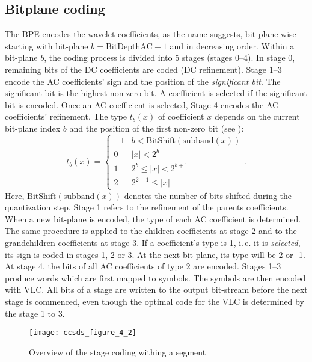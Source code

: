 \subsection{Bitplane coding}
The \gls{BPE} encodes the wavelet coefficients, as the name suggests, bit-plane-wise starting with bit-plane $b=\mathrm{BitDepthAC}-1$ and in decreasing order. Within a bit-plane $b$, the coding process is divided into 5 stages (stages 0--4). In stage 0, remaining bits of the DC coefficients are coded (DC refinement). Stage 1--3 encode the AC coefficients' sign and the position of the \textit{significant bit}. The significant bit is the highest non-zero bit. A coefficient is selected if the significant bit is encoded. Once an AC coefficient is selected, Stage 4 encodes the AC coefficients' refinement. The type $t_b(x)$ of coefficient $x$ depends on the current bit-plane index $b$ and the position of the first non-zero bit (see \cite[p.~4-26]{CCSDS122blue}):
\begin{equation}
t_b(x)=\left\{
  \begin{array}{ll}
    -1 & b<\mathrm{BitShift}(\mathrm{subband}(x))\\
     0 & \left|x\right|<2^b\\
     1 & 2^b\leq\left|x\right|<2^{b+1}\\
     2 & 2^{2+1}\leq\left|x\right|
  \end{array}\right. .
\end{equation}
Here, $\mathrm{BitShift}(\mathrm{subband}(x))$ denotes the number of bits shifted during the quantization step. Stage 1 refers to the refinement of the parents coefficients. When a new bit-plane is encoded, the type of each AC coefficient is determined. The same procedure is applied to the children coefficients at stage 2 and to the grandchildren coefficients at stage 3. If a coefficient's type is 1, i.\,e. it is \textit{selected}, its sign is coded in stages 1, 2 or 3. At the next bit-plane, its type will be 2 or -1. At stage 4, the bits of all AC coefficients of type 2 are encoded. Stages 1--3 produce words which are first mapped to symbols. The symbols are then encoded with \gls{VLC}. All bits of a stage are written to the output bit-stream before the next stage is commenced, even though the optimal code for the \gls{VLC} is determined by the stage 1 to 3.\\
\begin{figure}[tb]
  \centering
  \texttt{[image: ccsds\_figure\_4\_2]}
  \caption[Overview of the stage coding withing a segment]{Overview of the stage coding withing a segment \cite[p.~4-4]{CCSDS122blue}}
  \label{fig:ccsds:ccsds_figure_4_2}
\end{figure}

